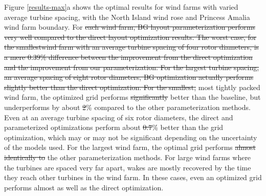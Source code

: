 \documentclass[wes, manuscript]{copernicus}
\providecommand{\DIFadd}[1]{{\protect\color{blue}\uwave{#1}}} %
\providecommand{\DIFdel}[1]{{\protect\color{red}\sout{#1}}}                      %
\providecommand{\DIFaddbegin}{} %
\providecommand{\DIFaddend}{} %
\providecommand{\DIFdelbegin}{} %
\providecommand{\DIFdelend}{} %
\begin{document}
Figure \ref{results-max}a shows the optimal results for wind farms with varied average turbine spacing, with the North Island wind rose and Princess Amalia wind farm boundary. For \DIFdelbegin \DIFdel{each wind farm, BG layout parameterization performs very well compared to the direct layout optimization results. The worst case, for the smallestwind farm with an average turbine spacing of four rotor diameters, is a mere 0.39\% difference between the improvement from the direct optimization and the improvement from our parameterization. For the largest turbine spacing, an average spacing of eight rotor diameters, BG optimization actually performs slightly better than the direct optimization.
For the smallest, }\DIFdelend \DIFaddbegin \DIFadd{the smallest, }\DIFaddend most tightly packed wind farm, the optimized grid performs \DIFdelbegin \DIFdel{significantly }\DIFdelend better than the baseline, but underperforms by about \DIFdelbegin \DIFdel{2}\DIFdelend \DIFaddbegin \DIFadd{2.3}\DIFaddend \% compared to the other parameterization methods. Even at an average turbine spacing of six rotor diameters, the direct and parameterized optimizations perform about \DIFdelbegin \DIFdel{0.7}\DIFdelend \DIFaddbegin \DIFadd{1}\DIFaddend \% better than the grid optimization, which may or may not be significant depending on the uncertainty of the models used. For the largest wind farm, the optimal grid performs \DIFdelbegin \DIFdel{almost identically to }\DIFdelend \DIFaddbegin \DIFadd{within 0.4\% of }\DIFaddend the other parameterization methods. For large wind farms where the turbines are spaced very far apart, wakes are mostly recovered by the time they reach other turbines in the wind farm. In these cases, even an optimized grid performs almost as well as the direct \DIFaddbegin \DIFadd{or BG }\DIFaddend optimization.  
\end{document}
